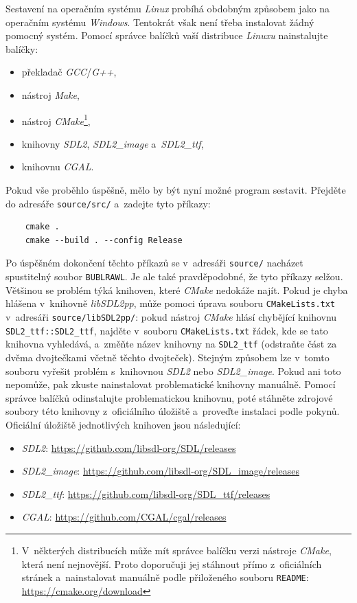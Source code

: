 Sestavení na operačním systému \emph{Linux} probíhá obdobným způsobem jako na operačním systému \emph{Windows}. Tentokrát však není třeba instalovat žádný pomocný systém. Pomocí správce balíčků vaší distribuce \emph{Linuxu} nainstalujte balíčky:
\begin{itemize}
    \item překladač \emph{GCC}/\emph{G++},
    \item nástroj \emph{Make},
    \item nástroj \emph{CMake}\footnote{V~některých distribucích může mít správce balíčku verzi nástroje \emph{CMake}, která není nejnovější. Proto doporučuji jej stáhnout přímo z~oficiálních stránek a~nainstalovat manuálně podle přiloženého souboru \texttt{README}: \url{https://cmake.org/download}},
    \item knihovny \emph{SDL2}, \emph{SDL2\_image} a~\emph{SDL2\_ttf},
    \item knihovnu \emph{CGAL}.
\end{itemize}

Pokud vše proběhlo úspěšně, mělo by být nyní možné program sestavit. Přejděte do adresáře \texttt{source/src/} a~zadejte tyto příkazy:
\begin{verbatim}
    cmake .
    cmake --build . --config Release
\end{verbatim}
Po úspěšném dokončení těchto příkazů se v~adresáři \texttt{source/} nacházet spustitelný soubor \texttt{BUBLRAWL}. Je ale také pravděpodobné, že tyto příkazy selžou. Většinou se problém týká knihoven, které \emph{CMake} nedokáže najít. Pokud je chyba hlášena v~knihovně \emph{libSDL2pp}, může pomoci úprava souboru \texttt{CMakeLists.txt} v~adresáři \texttt{source/libSDL2pp/}: pokud nástroj \emph{CMake} hlásí chybějící knihovnu \verb|SDL2_ttf::SDL2_ttf|, najděte v~souboru \texttt{CMakeLists.txt} řádek, kde se tato knihovna vyhledává, a~změňte název knihovny na \verb|SDL2_ttf| (odstraňte část za dvěma dvojtečkami včetně těchto dvojteček). Stejným způsobem lze v~tomto souboru vyřešit problém s~knihovnou \emph{SDL2} nebo \emph{SDL2\_image}. Pokud ani toto nepomůže, pak zkuste nainstalovat problematické knihovny manuálně. Pomocí správce balíčků odinstalujte problematickou knihovnu, poté stáhněte zdrojové soubory této knihovny z~oficiálního úložiště a~proveďte instalaci podle pokynů. Oficiální úložiště jednotlivých knihoven jsou následující:
\begin{itemize}
    \item \emph{SDL2}: \url{https://github.com/libsdl-org/SDL/releases}
    \item \emph{SDL2\_image}: \url{https://github.com/libsdl-org/SDL_image/releases}
    \item \emph{SDL2\_ttf}: \url{https://github.com/libsdl-org/SDL_ttf/releases}
    \item \emph{CGAL}: \url{https://github.com/CGAL/cgal/releases}
\end{itemize}



